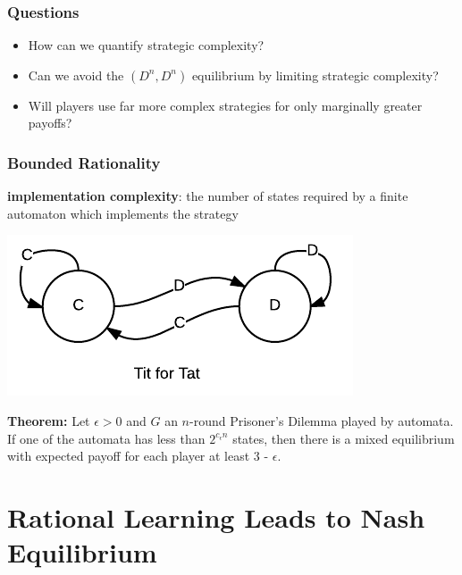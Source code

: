 \documentclass{beamer}
\begin{document}
\begin{frame}
	\frametitle{Questions}
		\begin{itemize}
			\item How can we quantify strategic complexity?
			\item Can we avoid the $(D^n, D^n)$ equilibrium by limiting strategic complexity?
			\item Will players use far more complex strategies for only marginally greater payoffs?
		\end{itemize}
\end{frame}

\begin{frame}
	\frametitle{Bounded Rationality}
	\textbf{implementation complexity}: the number of states required by a finite automaton which implements the strategy	
	
	\includegraphics[scale=0.5]{tit4tat}
	
	
	\noindent \textbf{Theorem:} Let $\epsilon > 0$ and $G$ an $n$-round Prisoner's Dilemma played by automata. If one of the automata has less than $2^{c_\epsilon n}$ states, then there is a mixed equilibrium with expected payoff for each player at least 3 - $\epsilon$.
	
	
\end{frame}

\section{Rational Learning Leads to Nash Equilibrium}

\begin{frame}
	
\end{frame}
\end{document}

